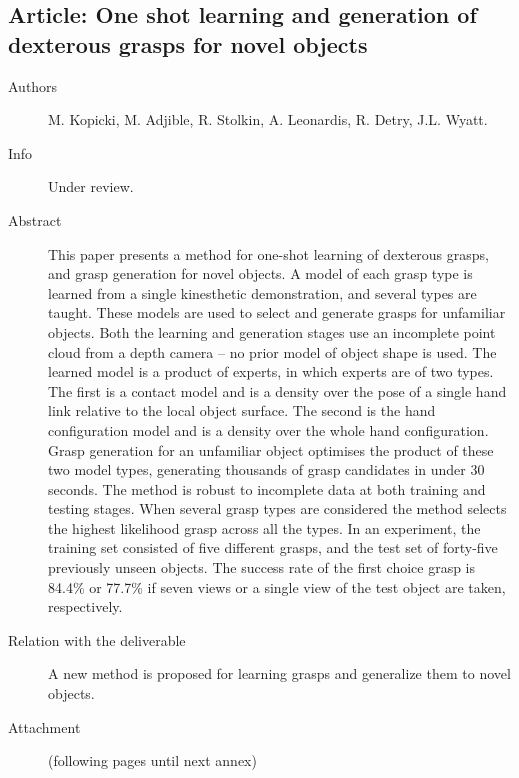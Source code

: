 \documentclass[a4paper,11pt,pdf]{pacmanreport}
\begin{document}
\subsection{Article: One shot learning and generation of dexterous grasps for novel objects} \label{ann:novelObjects}
\begin{description}
    \item[Authors] M. Kopicki, M. Adjible, R. Stolkin, A. Leonardis, R. Detry, J.L. Wyatt.
    \item[Info] Under review.
    \item[Abstract] This paper presents a method for one-shot learning of dexterous grasps, and grasp generation for novel objects. A model of each grasp type is learned from a single kinesthetic demonstration, and several types are taught. These models are used to select and generate grasps for unfamiliar objects. Both the learning and generation stages use an incomplete point cloud from a depth camera – no prior model of object shape is used. The learned model is a product of experts, in which experts are of two types. The first is a contact model and is a density over the pose of a single hand link relative to the local object surface. The second is the hand configuration model and is a density over the whole hand configuration. Grasp generation for an unfamiliar object optimises the product of these two model types, generating thousands of grasp candidates in under 30 seconds. The method is robust to incomplete data at both training and testing stages. When several grasp types are considered the method selects the highest likelihood grasp across all the types. In an experiment, the training set consisted  of five different grasps, and the test set of forty-five previously unseen objects. The success rate of the first choice grasp is 84.4\% or 77.7\% if seven views or a single view of the test object are taken, respectively.
    \item[Relation with the deliverable] A new method is proposed for learning grasps and generalize them to novel objects.
    \item[Attachment] (following pages until next annex)
\end{description}

\end{document}
